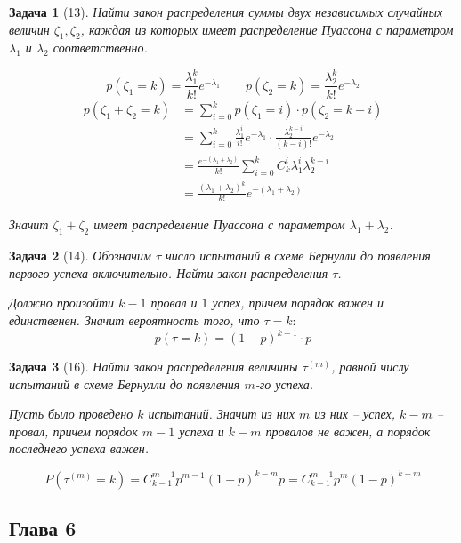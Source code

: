 \documentclass{article}
\theoremstyle{problemstyle}
\newtheorem{problem}{Задача}[section]
\begin{document}
\begin{problem}[13]
    Найти закон распределения суммы двух независимых случайных величин
    $\zeta_1, \zeta_2$, каждая из которых имеет распределение
    Пуассона с параметром $\lambda_1$ и $\lambda_2$ соответственно.

    \[
        p(\zeta_1 = k) = \frac{\lambda_1^k}{k!} e^{-\lambda_1}
        \qquad
        p(\zeta_2 = k) = \frac{\lambda_2^k}{k!} e^{-\lambda_2}
    \]
        \begin{align*}
            p(\zeta_1 + \zeta_2 = k) 
            &= \sum_{i=0}^k p(\zeta_1 = i) \cdot p(\zeta_2 = k - i) \\
            &= \sum_{i=0}^k \frac{\lambda_1^i}{i!} e^{-\lambda_1} \cdot \frac{\lambda_2^{k-i}}{(k-i)!} e^{-\lambda_2} \\
            &= \frac{e^{-(\lambda_1 + \lambda_2)}}{k!} \sum_{i=0}^k C_k^i \lambda_1^i \lambda_2^{k-i} \\
            &= \frac{(\lambda_1 + \lambda_2)^k}{k!} e^{-(\lambda_1 + \lambda_2)}
        \end{align*}

        Значит $\zeta_1 + \zeta_2$ имеет распределение Пуассона с параметром $\lambda_1 + \lambda_2$.
\end{problem}

\begin{problem}[14]
    Обозначим $\tau$ число испытаний в схеме Бернулли до появления
    первого успеха включительно. Найти закон распределения $\tau$.

    Должно произойти $k-1$ провал и $1$ успех,
    причем порядок важен и единственен.
    Значит вероятность того, что $\tau = k:$
    \[ p(\tau = k) = (1-p)^{k-1} \cdot p \]
\end{problem}


\begin{problem}[16]
    Найти закон распределения величины $\tau^{(m)}$, равной числу
    испытаний в схеме Бернулли до появления $m$-го успеха.

    Пусть было проведено $k$ испытаний.
    Значит из них $m$ из них -- успех, $k -m $ -- провал,
    причем порядок $m-1$ успеха и $k-m$ провалов не важен, а
    порядок последнего успеха важен.

    \[
        P(\tau^{(m)} = k) =
        C_{k-1}^{m-1} p^{m-1} (1-p)^{k-m} p = 
        C_{k-1}^{m-1} p^m (1-p)^{k-m}
    \]
\end{problem}
\subsection{Глава 6}
\end{document}
